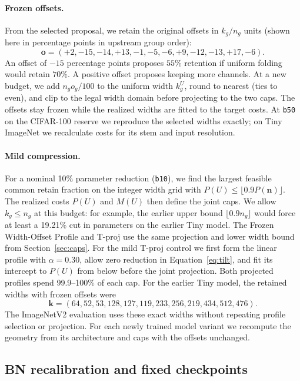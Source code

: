 \documentclass[11pt,a4paper]{article}
\newcommand{\FrozenProfile}{Frozen Width-Offset Profile}
\newcommand{\bten}{\texttt{b10}}
\newcommand{\bfifty}{\texttt{b50}}
\begin{document}
\paragraph{Frozen offsets.} From the selected proposal, we retain the
original offsets in $k_g/n_g$ units (shown here in percentage points in
upstream group order):
\begin{equation}
 \mathbf o=(+2,-15,-14,+13,-1,-5,-6,+9,-12,-13,+17,-6).
 \label{eq:offsets}
\end{equation}
An offset of $-15$ percentage points proposes $55\%$ retention if
uniform folding would retain $70\%$. A positive offset proposes keeping
more channels. At a new budget, we add $n_g o_g/100$ to the uniform width
$k_g^U$, round to nearest (ties to even), and clip to the legal width
domain before projecting to the two caps. The offsets stay frozen while
the realized widths are fitted to the target costs. At \bfifty{} on the
CIFAR-100 reserve we reproduce the selected widths exactly; on Tiny
ImageNet we recalculate costs for its stem and input resolution.

\paragraph{Mild compression.} For a nominal 10\% parameter reduction
(\bten{}), we find the largest feasible common retain fraction on the
integer width grid with $P(U)\le \lfloor0.9P(\mathbf n)\rfloor$.
The realized costs $P(U)$ and $M(U)$ then define the joint caps. We allow
$k_g\le n_g$ at this budget: for example, the earlier upper bound
$\lfloor0.9n_g\rfloor$ would force at least a 19.21\% cut in parameters
on the earlier Tiny model. The \FrozenProfile{} and T-proj use the same projection and
lower width bound from Section~\ref{sec:caps}. For the mild T-proj
control we first form the linear profile with $\alpha=0.30$, allow
zero reduction in Equation~\eqref{eq:tilt}, and fit its intercept to
$P(U)$ from below before the joint projection. Both projected profiles
spend 99.9--100\% of each cap. For the earlier Tiny model, the retained
widths with frozen offsets were
\[
 \mathbf k = (64,52,53,128,127,119,233,256,219,434,512,476).
\]
The ImageNetV2 evaluation uses these exact widths without repeating
profile selection or projection. For each newly trained model variant
we recompute the geometry from its architecture and caps with the
offsets unchanged.

\subsection{BN recalibration and fixed checkpoints}
\end{document}
